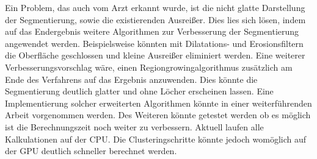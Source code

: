 \newline
Ein Problem, das auch vom Arzt erkannt wurde, ist die nicht glatte Darstellung der Segmentierung, sowie die existierenden Ausreißer. Dies lies sich lösen, indem auf das Endergebnis weitere Algorithmen zur Verbesserung der Segmentierung angewendet werden. Beispielsweise könnten mit Dilatations- und Erosionsfiltern die Oberfläche geschlossen und kleine Ausreißer eliminiert werden. Eine weiterer Verbesserungsvorschlag wäre, einen Regiongrowingalgorithmus zusätzlich am Ende des Verfahrens auf das Ergebnis anzuwenden. Dies könnte die Segmentierung deutlich glatter und ohne Löcher erscheinen lassen. Eine Implementierung solcher erweiterten Algorithmen könnte in einer weiterführenden Arbeit vorgenommen werden.
\newline
Des Weiteren könnte getestet werden ob es möglich ist die Berechnungszeit noch weiter zu verbessern. Aktuell laufen alle Kalkulationen auf der CPU. Die Clusteringschritte könnte jedoch womöglich auf der GPU deutlich schneller berechnet werden.


